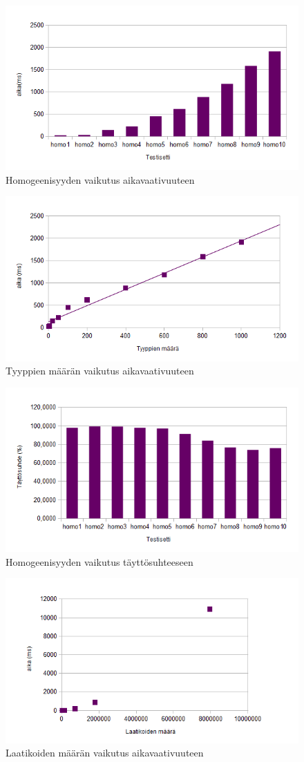 \documentclass[a4paper,12pt, titlepage]{article}
\begin{document}
\begin{figure}[H]
  \includegraphics{homoaika.png}
  \caption{Homogeenisyyden vaikutus aikavaativuuteen}
\end{figure}
\begin{figure}[H]
  \includegraphics{tyyppiaika.png}
  \caption{Tyyppien määrän vaikutus aikavaativuuteen}
\end{figure}
\begin{figure}[H]
  \includegraphics{homotaytto.png}
  \caption{Homogeenisyyden vaikutus täyttösuhteeseen}
\end{figure}
\begin{figure}[H]
  \includegraphics{maara-aika.png}
  \caption{Laatikoiden määrän vaikutus aikavaativuuteen}
\end{figure}
\end{document}
